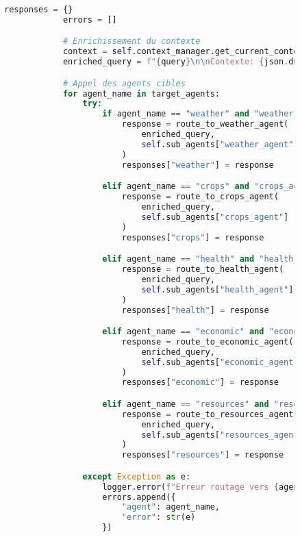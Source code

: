 \begin{figure}[h]
\begin{lstlisting}[language=Python, caption=Structure complète de l'agent principal]
            responses = {}
            errors = []

            # Enrichissement du contexte
            context = self.context_manager.get_current_context()
            enriched_query = f"{query}\n\nContexte: {json.dumps(context)}"

            # Appel des agents cibles
            for agent_name in target_agents:
                try:
                    if agent_name == "weather" and "weather_agent" in self.sub_agents:
                        response = route_to_weather_agent(
                            enriched_query,
                            self.sub_agents["weather_agent"]
                        )
                        responses["weather"] = response

                    elif agent_name == "crops" and "crops_agent" in self.sub_agents:
                        response = route_to_crops_agent(
                            enriched_query,
                            self.sub_agents["crops_agent"]
                        )
                        responses["crops"] = response

                    elif agent_name == "health" and "health_agent" in self.sub_agents:
                        response = route_to_health_agent(
                            enriched_query,
                            self.sub_agents["health_agent"]
                        )
                        responses["health"] = response

                    elif agent_name == "economic" and "economic_agent" in self.sub_agents:
                        response = route_to_economic_agent(
                            enriched_query,
                            self.sub_agents["economic_agent"]
                        )
                        responses["economic"] = response

                    elif agent_name == "resources" and "resources_agent" in self.sub_agents:
                        response = route_to_resources_agent(
                            enriched_query,
                            self.sub_agents["resources_agent"]
                        )
                        responses["resources"] = response

                except Exception as e:
                    logger.error(f"Erreur routage vers {agent_name}: {str(e)}")
                    errors.append({
                        "agent": agent_name,
                        "error": str(e)
                    })


\end{lstlisting}
\end{figure}
